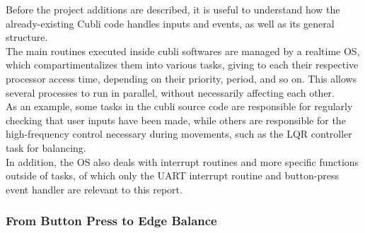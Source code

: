 Before the project additions are described, it is useful to understand how the already-existing Cubli code handles inputs and events, as well as its general structure.\\

The main routines executed inside cubli softwares are managed by a realtime OS, which compartimentalizes them into various tasks, giving to each their respective processor access time, depending on their priority, period, and so on. This allows several processes to run in parallel, without necessarily affecting each other.\\

As an example, some tasks in the cubli source code are responsible for regularly checking that user inputs have been made, while others are responsible for the high-frequency control necessary during movements, such as the LQR controller task for balancing.\\

In addition, the OS also deals with interrupt routines and more specific functions outside of tasks, of which only the UART interrupt routine and button-press event handler are relevant to this report.\\

\subsubsection{From Button Press to Edge Balance}


